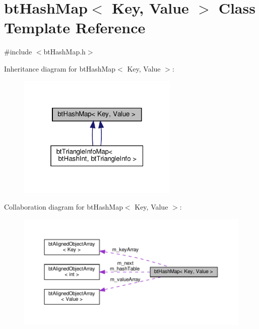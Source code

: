 \hypertarget{classbtHashMap}{}\section{bt\+Hash\+Map$<$ Key, Value $>$ Class Template Reference}
\label{classbtHashMap}


{\ttfamily \#include $<$bt\+Hash\+Map.\+h$>$}



Inheritance diagram for bt\+Hash\+Map$<$ Key, Value $>$\+:
\nopagebreak
\begin{figure}[H]
\begin{center}
\leavevmode
\includegraphics[width=217pt]{classbtHashMap__inherit__graph}
\end{center}
\end{figure}


Collaboration diagram for bt\+Hash\+Map$<$ Key, Value $>$\+:
\nopagebreak
\begin{figure}[H]
\begin{center}
\leavevmode
\includegraphics[width=350pt]{classbtHashMap__coll__graph}
\end{center}
\end{figure}

